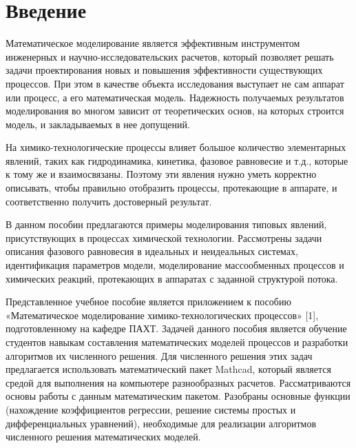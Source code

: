 \section*{Введение}
Математическое моделирование является эффективным инструментом инженерных и научно-исследовательских расчетов, который позволяет решать задачи проектирования новых и повышения эффективности существующих процессов. При этом в качестве объекта исследования выступает не сам аппарат или процесс, а его математическая модель. Надежность получаемых результатов моделирования во многом зависит от теоретических основ, на которых строится модель, и закладываемых в нее допущений.

На химико-технологические процессы влияет большое количество элементарных явлений, таких как гидродинамика, кинетика, фазовое равновесие и т.д., которые к тому же и взаимосвязаны. Поэтому эти явления нужно уметь корректно описывать, чтобы правильно отобразить процессы, протекающие в аппарате, и соответственно получить достоверный результат.

В данном пособии предлагаются примеры моделирования типовых явлений, присутствующих в процессах химической технологии. Рассмотрены задачи описания фазового равновесия в идеальных и неидеальных системах, идентификация параметров модели, моделирование массообменных процессов и химических реакций, протекающих в аппаратах с заданной структурой потока.

Представленное учебное пособие является приложением к пособию «Математическое моделирование химико-технологических процессов» [1], подготовленному на кафедре ПАХТ. Задачей данного пособия является обучение студентов навыкам составления математических моделей процессов и разработки алгоритмов их численного решения. Для численного решения этих задач предлагается использовать математический пакет Mathcad, который является средой для выполнения на компьютере разнообразных расчетов. Рассматриваются основы работы с данным математическим пакетом. Разобраны основные функции (нахождение коэффициентов регрессии, решение системы простых и дифференциальных уравнений), необходимые для реализации алгоритмов численного решения математических моделей.